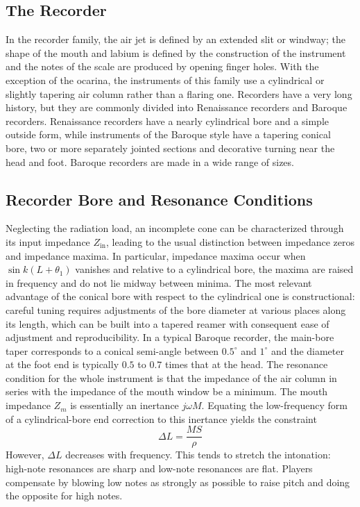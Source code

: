 \subsection{The Recorder}

In the recorder family, the air jet is defined by an extended slit or windway; the shape of the mouth and labium is defined by the construction of the instrument and the notes of the scale are produced by opening finger holes. With the exception of the ocarina, the instruments of this family use a cylindrical or slightly tapering air column rather than a flaring one. Recorders have a very long history, but they are commonly divided into Renaissance recorders and Baroque recorders. Renaissance recorders have a nearly cylindrical bore and a simple outside form, while instruments of the Baroque style have a tapering conical bore, two or more separately jointed sections and decorative turning near the head and foot. Baroque recorders are made in a wide range of sizes.

\subsection{Recorder Bore and Resonance Conditions}

Neglecting the radiation load, an incomplete cone can be characterized through its input impedance \(Z_{\mathrm{in}}\), leading to the usual distinction between impedance zeros and impedance maxima. In particular, impedance maxima occur when \(\sin k(L+\theta_1)\) vanishes and relative to a cylindrical bore, the maxima are raised in frequency and do not lie midway between minima. The most relevant advantage of the conical bore with respect to the cylindrical one is constructional: careful tuning requires adjustments of the bore diameter at various places along its length, which can be built into a tapered reamer with consequent ease of adjustment and reproducibility. In a typical Baroque recorder, the main-bore taper corresponds to a conical semi-angle between \(0.5^\circ\) and \(1^\circ\) and the diameter at the foot end is typically \(0.5\) to \(0.7\) times that at the head. The resonance condition for the whole instrument is that the impedance of the air column in series with the impedance of the mouth window be a minimum. The mouth impedance \(Z_m\) is essentially an inertance \(j\omega M\). Equating the low-frequency form of a cylindrical-bore end correction to this inertance yields the constraint
\[
\Delta L = \frac{MS}{\rho}
\]
However, \(\Delta L\) decreases with frequency. This tends to stretch the intonation: high-note resonances are sharp and low-note resonances are flat. Players compensate by blowing low notes as strongly as possible to raise pitch and doing the opposite for high notes.

